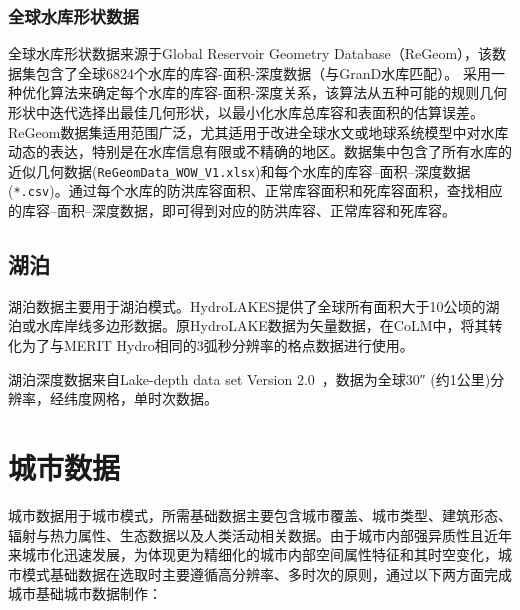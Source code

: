 \subsubsection{全球水库形状数据}

全球水库形状数据来源于Global Reservoir Geometry Database（ReGeom），该数据集包含了全球6824个水库的库容-面积-深度数据（与GranD水库匹配）。\citet{yigzaw2018new} 采用一种优化算法来确定每个水库的库容-面积-深度关系，该算法从五种可能的规则几何形状中迭代选择出最佳几何形状，以最小化水库总库容和表面积的估算误差。ReGeom数据集适用范围广泛，尤其适用于改进全球水文或地球系统模型中对水库动态的表达，特别是在水库信息有限或不精确的地区。数据集中包含了所有水库的近似几何数据(\texttt{ReGeomData\_WOW\_V1.xlsx})和每个水库的库容--面积--深度数据(\texttt{*.csv})。通过每个水库的防洪库容面积、正常库容面积和死库容面积，查找相应的库容--面积--深度数据，即可得到对应的防洪库容、正常库容和死库容。


\subsection{湖泊}
湖泊数据主要用于湖泊模式。HydroLAKES提供了全球所有面积大于10公顷的湖泊或水库岸线多边形数据\citep{messager2016nc}。原HydroLAKE数据为矢量数据，在CoLM中，将其转化为了与MERIT Hydro相同的3弧秒分辨率的格点数据进行使用。

湖泊深度数据来自Lake-depth data set Version 2.0~\citep{kourzeneva2012global}，数据为全球\ang{;;30} (约1公里)分辨率，经纬度网格，单时次数据。


\section{城市数据}\label{城市数据}
城市数据用于城市模式，所需基础数据主要包含城市覆盖、城市类型、建筑形态、辐射与热力属性、生态数据以及人类活动相关数据。由于城市内部强异质性且近年来城市化迅速发展，为体现更为精细化的城市内部空间属性特征和其时空变化，城市模式基础数据在选取时主要遵循高分辨率、多时次的原则，通过以下两方面完成城市基础城市数据制作：

